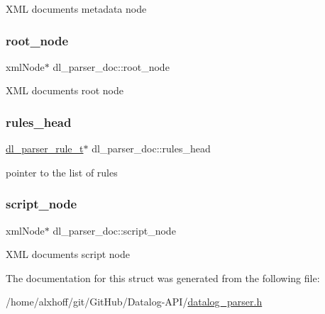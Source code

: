 X\+ML document\textquotesingle{}s metadata node \mbox{\label{structdl__parser__doc_a66e2772a6557aafd00370ecad3a6b428}} 
\subsubsection{\texorpdfstring{root\+\_\+node}{root\_node}}
{\footnotesize\ttfamily xml\+Node$\ast$ dl\+\_\+parser\+\_\+doc\+::root\+\_\+node}

X\+ML document\textquotesingle{}s root node \mbox{\label{structdl__parser__doc_a46ff67ec42f4b114c00fc804296bf1aa}} 
\subsubsection{\texorpdfstring{rules\+\_\+head}{rules\_head}}
{\footnotesize\ttfamily \hyperlink{datalog__parser_8h_a8024697b9e41c6c143acefaaf5d047cd}{dl\+\_\+parser\+\_\+rule\+\_\+t}$\ast$ dl\+\_\+parser\+\_\+doc\+::rules\+\_\+head}

pointer to the list of rules \mbox{\label{structdl__parser__doc_a9b8a86089333b4dd2d50bbcb5e784562}} 
\subsubsection{\texorpdfstring{script\+\_\+node}{script\_node}}
{\footnotesize\ttfamily xml\+Node$\ast$ dl\+\_\+parser\+\_\+doc\+::script\+\_\+node}

X\+ML document\textquotesingle{}s script node 

The documentation for this struct was generated from the following file\+:\begin{DoxyCompactItemize}
\item 
/home/alxhoff/git/\+Git\+Hub/\+Datalog-\/\+A\+P\+I/\hyperlink{datalog__parser_8h}{datalog\+\_\+parser.\+h}\end{DoxyCompactItemize}
